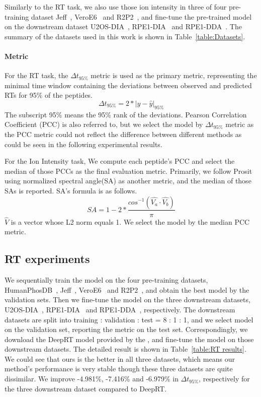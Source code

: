 Similarly to the RT task, we also use those ion intensity in three of four pre-training dataset Jeff~\cite{liu2018vivo}, VeroE6~\cite{bouhaddou2020global} and R2P2~\cite{leutert2019r2}, and fine-tune the pre-trained model on the downstream dataset U2OS-DIA~\cite{wang2020naguider}, RPE1-DIA~\cite{bekker2020rapid} and RPE1-DDA~\cite{bekker2020rapid}. The summary of the datasets used in this work is shown in Table~\ref{table:Datasets}.
\paragraph*{Metric} For the RT task, the $\Delta$$t_{95\%}$ metric is used as the primary metric, representing the minimal time window containing the deviations between observed and predicted RTs for 95\% of the peptides.
\[ \Delta t_{95\%} = 2 * | y - \hat{y} |_{95\%} \]
The subscript 95\% means the 95\% rank of the deviations.
Pearson Correlation Coefficient (PCC) is also referred to, but we select the model by $\Delta$$t_{95\%}$ metric as the PCC metric could not reflect the difference between different methods as could be seen in the following experimental results.

For the Ion Intensity task, We compute each peptide's PCC and select the median of those PCCs as the final evaluation metric. Primarily, we follow Prosit~\cite{gessulat2019prosit} using normalized
spectral angle(SA) as another metric, and the median of those SAs is reported.
SA's formula is as follows.
\[ SA = 1 - 2 * \frac{cos^{-1}(\hat{V_a}\cdot\hat{V_b})}{\pi} \]
$\hat{V}$ is a vector whose L2 norm equals 1. We select the model by the median PCC metric.

\subsection{RT experiments}
We sequentially train the model on the four pre-training datasets, HumanPhosDB~\cite{lawrence2016plug}, Jeff~\cite{liu2018vivo}, VeroE6~\cite{bouhaddou2020global} and R2P2~\cite{leutert2019r2}, and obtain the best model by the validation sets. Then we fine-tune the model on the three downstream datasets, U2OS-DIA~\cite{wang2020naguider}, RPE1-DIA~\cite{bekker2020rapid} and RPE1-DDA~\cite{bekker2020rapid}, respectively. 
The downstream datasets are split into training : validation : test = 8 : 1 : 1, and we select model on the validation set, reporting the metric on the test set. 
Correspondingly, we download the DeepRT model provided by the \cite{ma2018improved}, and fine-tune the model on those downstream datasets. The detailed result is shown in Table~\ref{table:RT results}. We could see that ours is the better in all three datasets, which means our method's performance is very stable though these three datasets are quite dissimilar. We improve -4.981\%, -7.416\% and -6.979\% in $\Delta$$t_{95\%}$, respectively for the three downstream dataset compared to DeepRT. 

